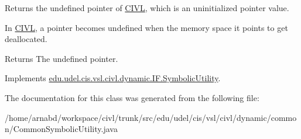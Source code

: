 Returns the undefined pointer of \hyperlink{classedu_1_1udel_1_1cis_1_1vsl_1_1civl_1_1CIVL}{C\+I\+V\+L}, which is an uninitialized pointer value. 

In \hyperlink{classedu_1_1udel_1_1cis_1_1vsl_1_1civl_1_1CIVL}{C\+I\+V\+L}, a pointer becomes undefined when the memory space it points to get deallocated.

\begin{DoxyReturn}{Returns}
The undefined pointer. 
\end{DoxyReturn}


Implements \hyperlink{interfaceedu_1_1udel_1_1cis_1_1vsl_1_1civl_1_1dynamic_1_1IF_1_1SymbolicUtility_a18d94e4f52d8d13f10973781a0dfa9e9}{edu.\+udel.\+cis.\+vsl.\+civl.\+dynamic.\+I\+F.\+Symbolic\+Utility}.



The documentation for this class was generated from the following file\+:\begin{DoxyCompactItemize}
\item 
/home/arnabd/workspace/civl/trunk/src/edu/udel/cis/vsl/civl/dynamic/common/Common\+Symbolic\+Utility.\+java\end{DoxyCompactItemize}

